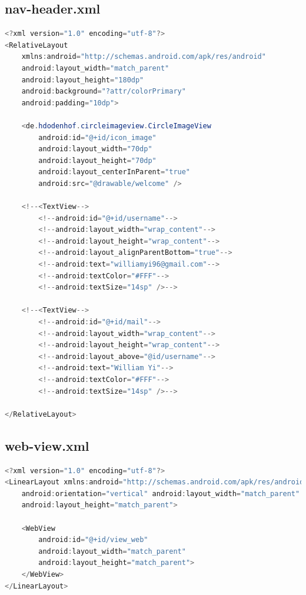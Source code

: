 \documentclass[UTF8, Microsoft YaHei]{book}
\begin{document}
    \subsection{nav-header.xml}
\begin{small}
\begin{lstlisting}[language=java]
<?xml version="1.0" encoding="utf-8"?>
<RelativeLayout
    xmlns:android="http://schemas.android.com/apk/res/android"
    android:layout_width="match_parent"
    android:layout_height="180dp"
    android:background="?attr/colorPrimary"
    android:padding="10dp">

    <de.hdodenhof.circleimageview.CircleImageView
        android:id="@+id/icon_image"
        android:layout_width="70dp"
        android:layout_height="70dp"
        android:layout_centerInParent="true"
        android:src="@drawable/welcome" />

    <!--<TextView-->
        <!--android:id="@+id/username"-->
        <!--android:layout_width="wrap_content"-->
        <!--android:layout_height="wrap_content"-->
        <!--android:layout_alignParentBottom="true"-->
        <!--android:text="williamyi96@gmail.com"-->
        <!--android:textColor="#FFF"-->
        <!--android:textSize="14sp" />-->

    <!--<TextView-->
        <!--android:id="@+id/mail"-->
        <!--android:layout_width="wrap_content"-->
        <!--android:layout_height="wrap_content"-->
        <!--android:layout_above="@id/username"-->
        <!--android:text="William Yi"-->
        <!--android:textColor="#FFF"-->
        <!--android:textSize="14sp" />-->

</RelativeLayout>
\end{lstlisting}
\end{small}
    \subsection{web-view.xml}
\begin{small}
\begin{lstlisting}[language=java]
<?xml version="1.0" encoding="utf-8"?>
<LinearLayout xmlns:android="http://schemas.android.com/apk/res/android"
    android:orientation="vertical" android:layout_width="match_parent"
    android:layout_height="match_parent">

    <WebView
        android:id="@+id/view_web"
        android:layout_width="match_parent"
        android:layout_height="match_parent">
    </WebView>
</LinearLayout>
\end{lstlisting}
\end{small}
\end{document}
